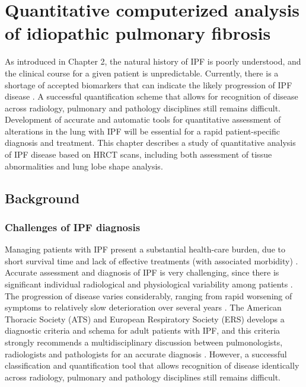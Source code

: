\chapter{Quantitative computerized analysis of idiopathic pulmonary fibrosis} \label{Yuwen_QuantitiativeAnalysis}

As introduced in Chapter 2, the natural history of IPF is poorly understood, and the clinical course for a given patient is unpredictable. Currently, there is a shortage of accepted biomarkers that can indicate the likely progression of IPF disease \citep{bartholmai2013quantitative}. A successful quantification scheme that allows for recognition of disease across radiology, pulmonary and pathology disciplines still remains difficult. Development of accurate and automatic tools for quantitative assessment of alterations in the lung with IPF will be essential for a rapid patient-specific diagnosis and treatment. This chapter describes a study of quantitative analysis of IPF disease based on HRCT scans, including both assessment of tissue abnormalities and lung lobe shape analysis. 

\section{Background}
\subsection{Challenges of IPF diagnosis} \label{Challenge}
Managing patients with IPF present a substantial health-care burden, due to short survival time and lack of effective treatments (with associated morbidity) \citep{olson2007mortality,raghunath2014quantitative}. Accurate assessment and diagnosis of IPF is very challenging, since there is significant individual radiological and physiological variability among patients \citep{devaraj2014imaging}. The progression of disease varies considerably, ranging from rapid worsening of symptoms to relatively slow deterioration over several years \citep{king2011idiopathic,richeldi2017idiopathic}. The American Thoracic Society (ATS) and European Respiratory Society (ERS) develops a diagnostic criteria and schema for adult patients with IPF, and this criteria strongly recommends a multidisciplinary discussion between pulmonologists, radiologists and pathologists for an accurate diagnosis \citep{raghu2011official,travis2013official}. However, a successful classification and quantification tool that allows recognition of disease identically across radiology, pulmonary and pathology disciplines still remains difficult. 

